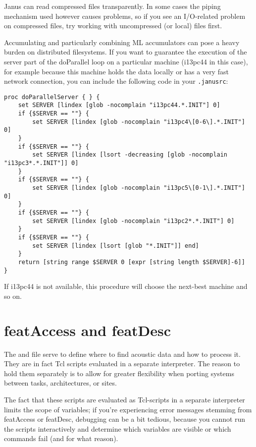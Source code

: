 Janus can   read compressed files  transparently.   In some cases  the
piping  mechanism  used however  causes  problems,  so  if you see  an
I/O-related problem on compressed files, try working with uncompressed
(or local) files first.

Accumulating and particularly combining   ML accumulators can pose   a
heavy burden on distributed filesystems. If you  want to guarantee the
execution of the  server part of the doParallel  loop  on a particular
machine (i13pc44 in this case), for example because this machine holds
the data  locally  or has   a very  fast network connection,   you can
include the following code in your \texttt{.janusrc}:

\begin{verbatim}
proc doParallelServer { } {
    set SERVER [lindex [glob -nocomplain "i13pc44.*.INIT"] 0]
    if {$SERVER == ""} {
        set SERVER [lindex [glob -nocomplain "i13pc4\[0-6\].*.INIT"] 0]
    }
    if {$SERVER == ""} {
        set SERVER [lindex [lsort -decreasing [glob -nocomplain "i13pc3*.*.INIT"]] 0]
    }
    if {$SERVER == ""} {
        set SERVER [lindex [glob -nocomplain "i13pc5\[0-1\].*.INIT"] 0]
    }
    if {$SERVER == ""} {
        set SERVER [lindex [glob -nocomplain "i13pc2*.*.INIT"] 0]
    }
    if {$SERVER == ""} {
        set SERVER [lindex [lsort [glob "*.INIT"]] end]
    }
    return [string range $SERVER 0 [expr [string length $SERVER]-6]]
}
\end{verbatim}

If i13pc44 is not available,  this procedure will choose the next-best
machine and so on.


\section{featAccess and featDesc} \label{trouble:feat}

The    and   file serve to
define where to find acoustic data and how to  process it. They are in
fact Tcl scripts  evaluated in a separate  interpreter.  The reason to
hold them separately is to  allow for greater flexibility when porting
systems between tasks, architectures, or sites.

The fact that these scripts are evaluated as Tcl-scripts in a separate
interpreter limits the   scope  of variables;  if you're  experiencing
error messages stemming from  featAccess or featDesc, debugging can be
a bit tedious, because you   cannot run the scripts interactively  and
determine which variables are visible  or which commands fail (and for
what reason).


